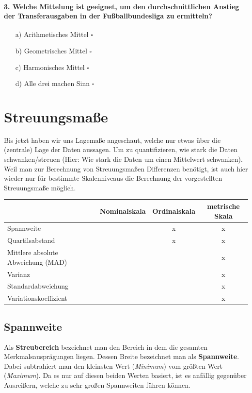 \documentclass[a4paper]{article}
\begin{document}
\paragraph{3. Welche Mittelung ist geeignet, um den durchschnittlichen Anstieg der Transferausgaben in der Fußballbundesliga zu ermitteln?}

\begin{itemize}
    \item[a)] Arithmetisches Mittel \hfill $\square$
    \item[b)] Geometrisches Mittel \hfill $\square$
    \item[c)] Harmonisches Mittel \hfill $\square$
    \item[d)] Alle drei machen Sinn \hfill $\square$
\end{itemize}


\newpage


\section{Streuungsmaße}
Bis jetzt haben wir uns Lagemaße angeschaut, welche nur etwas über die (zentrale) Lage der Daten aussagen. Um zu quantifizieren, wie stark die Daten schwanken/streuen (Hier: Wie stark die Daten um einen Mittelwert schwanken). Weil man zur Berechnung von Streuungsmaßen Differenzen benötigt, ist auch hier wieder nur für bestimmte Skalenniveaus die Berechnung der vorgestellten Streuungsmaße möglich.

\begin{center}
 \begin{tabular}{|l c c c|} 
 \hline
 & Nominalskala & Ordinalskala& metrische Skala\\
 \hline\hline
 Spannweite & & x & x \\ 
 \hline
Quartilsabstand &  & x & x \\
 \hline
 Mittlere absolute Abweichung (MAD) &  &  & x \\
 \hline
Varianz &  &  & x \\
 \hline
Standardabweichung &  &  & x \\
\hline
Variationskoeffizient & & & x\\
\hline  
\end{tabular}
\end{center}

\subsection{Spannweite}
Als \textbf{Streubereich} bezeichnet man den Bereich in dem die gesamten Merkmalsausprägungen liegen. Dessen Breite bezeichnet man als \textbf{Spannweite}. Dabei subtrahiert man den kleinsten Wert (\textit{Minimum}) vom größten Wert (\textit{Maximum}). Da es nur auf diesen beiden Werten basiert, ist es anfällig gegenüber Ausreißern, welche zu sehr großen Spannweiten führen können.\\
\end{document}
